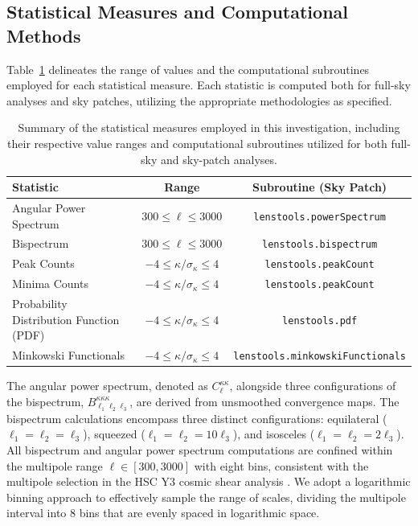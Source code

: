 \subsection{Statistical Measures and Computational Methods}
Table~\ref{tab:statistics} delineates the range of values and the computational subroutines employed for each statistical measure. Each statistic is computed both for full-sky analyses and sky patches, utilizing the appropriate methodologies as specified.
\begin{table}[htbp]
    \centering
    \begin{tabular}{lcc}
    \toprule
    \textbf{Statistic} & \textbf{Range} & \textbf{Subroutine (Sky Patch)} \\
    \midrule
    Angular Power Spectrum & $300 \leq \ell \leq 3000$ & \texttt{lenstools.powerSpectrum} \\
    Bispectrum & $300 \leq \ell \leq 3000$ & \texttt{lenstools.bispectrum} \\
    Peak Counts & $-4 \leq \kappa/\sigma_\kappa \leq 4$ & \texttt{lenstools.peakCount} \\
    Minima Counts & $-4 \leq \kappa/\sigma_\kappa \leq 4$ & \texttt{lenstools.peakCount} \\
    Probability Distribution Function (PDF) & $-4 \leq \kappa/\sigma_\kappa \leq 4$ & \texttt{lenstools.pdf} \\
    Minkowski Functionals & $-4 \leq \kappa/\sigma_\kappa \leq 4$ & \texttt{lenstools.minkowskiFunctionals} \\
    \bottomrule
    \end{tabular}
    \caption{Summary of the statistical measures employed in this investigation, including their respective value ranges and computational subroutines utilized for both full-sky and sky-patch analyses.}\label{tab:statistics}
\end{table}
The angular power spectrum, denoted as $C_{\ell}^{\kappa\kappa}$, alongside three configurations of the bispectrum, $B_{\ell_1\ell_2\ell_3}^{\kappa\kappa\kappa}$, are derived from unsmoothed convergence maps. The bispectrum calculations encompass three distinct configurations: equilateral ($\ell_1 = \ell_2 = \ell_3$), squeezed ($\ell_1 = \ell_2 = 10\ell_3$), and isosceles ($\ell_1 = \ell_2 = 2\ell_3$). 
All bispectrum and angular power spectrum computations are confined within the multipole range $\ell \in [300, 3000]$ with eight bins, consistent with the multipole selection in the HSC Y3 cosmic shear analysis \citep{2023PhRvD.108l3519D}. We adopt a logarithmic binning approach to effectively sample the range of scales, dividing the multipole interval into 8 bins that are evenly spaced in logarithmic space. 

